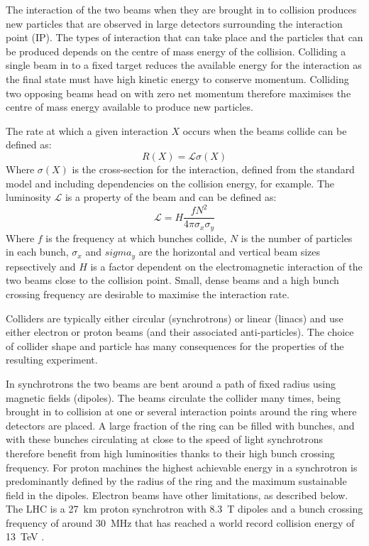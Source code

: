 The interaction of the two beams when they are brought in to collision produces new particles that are observed in large detectors surrounding the interaction point (IP). The types of interaction that can take place and the particles that can be produced depends on the centre of mass energy of the collision. Colliding a single beam in to a fixed target reduces the available energy for the interaction as the final state must have high kinetic energy to conserve momentum. Colliding two opposing beams head on with zero net momentum therefore maximises the centre of mass energy available to produce new particles.

The rate at which a given interaction \(X\) occurs when the beams collide can be defined as:
\begin{equation}
R(X) = \mathscr{L} \sigma(X)
\end{equation}
Where \(\sigma(X)\) is the cross-section for the interaction, defined from the standard model and including dependencies on the collision energy, for example. The luminosity \(\mathscr{L}\) is a property of the beam and can be defined as:
\begin{equation}
\mathscr{L} = H\frac{fN^2}{4\pi\sigma_x\sigma_y}
\end{equation}
Where \(f\) is the frequency at which bunches collide, \(N\) is the number of particles in each bunch, \(\sigma_x\) and \(sigma_y\) are the horizontal and vertical beam sizes repsectively and \(H\) is a factor dependent on the electromagnetic interaction of the two beams close to the collision point. Small, dense beams and a high bunch crossing frequency are desirable to maximise the interaction rate.


Colliders are typically either circular (synchrotrons) or linear (linacs) and use either electron or proton beams (and their associated anti-particles). The choice of collider shape and particle has many consequences for the properties of the resulting experiment. 

In synchrotrons the two beams are bent around a path of fixed radius using magnetic fields (dipoles). The beams circulate the collider many times, being brought in to collision at one or several interaction points around the ring where detectors are placed. A large fraction of the ring can be filled with bunches, and with these bunches circulating at close to the speed of light synchrotrons therefore benefit from high luminosities thanks to their high bunch crossing frequency. For proton machines the highest achievable energy in a synchrotron is predominantly defined by the radius of the ring and the maximum sustainable field in the dipoles. Electron beams have other limitations, as described below. The LHC is a 27~km proton synchrotron with 8.3~T dipoles and a bunch crossing frequency of around 30~MHz that has reached a world record collision energy of 13~TeV \cite{LHC}.


